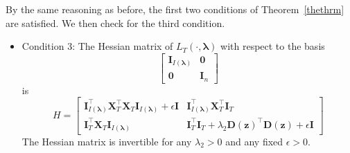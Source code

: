 \documentclass[10pt,letterpaper]{article}
\begin{document}
By the same reasoning as before, the first two conditions of Theorem~\ref{thethrm} are satisfied. We then check for the third condition.
\begin{itemize}
\item[] Condition 3: The Hessian matrix of $L_T(\cdot, \boldsymbol{\lambda})$ with respect to the basis 
\begin{equation}
\begin{bmatrix}
\boldsymbol I_{I(\boldsymbol\lambda)} & \boldsymbol 0\\
\boldsymbol 0 & \boldsymbol I_n
\end{bmatrix}
\label{eq:aplmbasis}
\end{equation}
is
\begin{equation}
H =
\begin{bmatrix}
\boldsymbol I_{I(\boldsymbol \lambda)}^\top \boldsymbol X_T^\top \boldsymbol X_T \boldsymbol I_{I(\boldsymbol \lambda)} + \epsilon \boldsymbol I
&  \boldsymbol I_{I(\boldsymbol \lambda)}^\top \boldsymbol X_T^\top \boldsymbol I_T \\
\boldsymbol I_T^\top \boldsymbol X_T \boldsymbol I_{I(\boldsymbol \lambda)} &
\boldsymbol I_T^\top \boldsymbol{I}_T + \lambda_2 \boldsymbol{D}(\boldsymbol{z})^\top \boldsymbol{D}(\boldsymbol{z}) + \epsilon \boldsymbol I
\end{bmatrix}
\end{equation}
The Hessian matrix is invertible for any $\lambda_2 > 0$ and any fixed $\epsilon > 0$.
\end{itemize}
\end{document}
